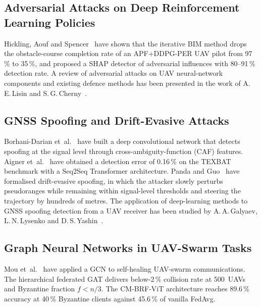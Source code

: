 \subsection{Adversarial Attacks on Deep Reinforcement Learning
Policies}
Hickling, Aouf and Spencer~\cite{hickling_2023_uav} have shown that
the iterative BIM method drops the obstacle-course completion rate
of an APF+DDPG-PER UAV pilot from 97\,\% to 35\,\%, and proposed a
SHAP detector of adversarial influences with 80--91\,\% detection
rate. A review of adversarial attacks on UAV neural-network
components and existing defence methods has been presented in the
work of A.\,E.\,Lisin and S.\,G.\,Cherny~\cite{Lisin2023uav}.

\subsection{GNSS Spoofing and Drift-Evasive Attacks}
Borhani-Darian et~al.~\cite{borhani_2024_uav} have built a deep
convolutional network that detects spoofing at the signal level
through cross-ambiguity-function (CAF) features. Aigner
et~al.~\cite{aigner_2025_uav} have obtained a detection error of
0.16\,\% on the TEXBAT benchmark with a Seq2Seq Transformer
architecture. Panda and Guo~\cite{panda_2025_uav} have formalised
drift-evasive spoofing, in which the attacker slowly perturbs
pseudoranges while remaining within signal-level thresholds and
steering the trajectory by hundreds of metres. The application of
deep-learning methods to GNSS spoofing detection from a UAV receiver
has been studied by A.\,A.\,Galyaev, L.\,N.\,Lysenko and
D.\,S.\,Yashin~\cite{Galyaev2024gnss}.

\subsection{Graph Neural Networks in UAV-Swarm Tasks}
Mou et~al.~\cite{mou_2021_uav} have applied a GCN to self-healing
UAV-swarm communications. The hierarchical federated GAT
\cite{hfgat_2025_uav} delivers below-2\,\% collision rate at 500~UAVs
and Byzantine fraction $f<n/3$. The CM-BRF-ViT architecture
\cite{cmbrf_vit_2026_uav} reaches 89.6\,\% accuracy at 40\,\%
Byzantine clients against 45.6\,\% of vanilla FedAvg.

